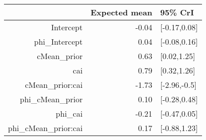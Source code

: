 \begin{tabular}{rrl}
  \hline
 & Expected mean & 95\% CrI \\ 
  \hline
Intercept & -0.04 & [-0.17,0.08] \\ 
  phi\_Intercept & 0.04 & [-0.08,0.16] \\ 
  cMean\_prior & 0.63 & [0.02,1.25] \\ 
  cai & 0.79 & [0.32,1.26] \\ 
  cMean\_prior:cai & -1.73 & [-2.96,-0.5] \\ 
  phi\_cMean\_prior & 0.10 & [-0.28,0.48] \\ 
  phi\_cai & -0.21 & [-0.47,0.05] \\ 
  phi\_cMean\_prior:cai & 0.17 & [-0.88,1.23] \\ 
   \hline
\end{tabular}

